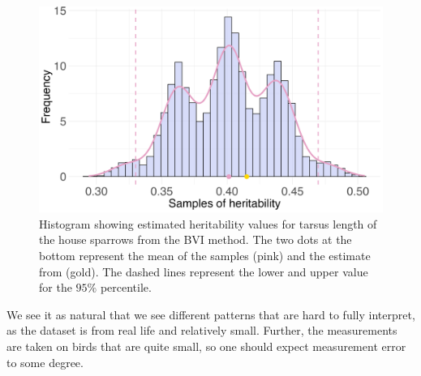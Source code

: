 \begin{figure}[H]%
  \centering
  \includegraphics[width=1\linewidth]{Figures/House sparrow study/Heritability_tarsus.png}
  \caption{Histogram showing estimated heritability values for tarsus length of the house sparrows from the BVI method. The two dots at the bottom represent the mean of the samples (pink) and the estimate from \citep{Silva2017} (gold). The dashed lines represent the lower and upper value for the $95\%$ percentile.}
  \label{fig:heritability_tarsus}
\end{figure}
\noindent We see it as natural that we see different patterns that are hard to fully interpret, as the dataset is from real life and relatively small. Further, the measurements are taken on birds that are quite small, so one should expect measurement error to some degree.
  



